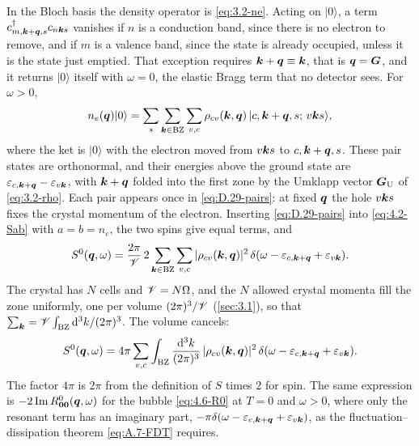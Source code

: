 In the Bloch basis the density operator is \cref{eq:3.2-ne}. Acting on $|0\rangle$, a term $c^\dagger_{m,\bm{k}+\bm{q},s}c_{n\bm{k}s}$ vanishes if $n$ is a conduction band, since there is no electron to remove, and if $m$ is a valence band, since the state is already occupied, unless it is the state just emptied. That exception requires $\bm{k} + \bm{q} \equiv \bm{k}$, that is $\bm{q} = \bm{G}$, and it returns $|0\rangle$ itself with $\omega = 0$, the elastic Bragg term that no detector sees. For $\omega > 0$,
\begin{equation}
  n_e(\bm{q})|0\rangle = \sum_s\sum_{\bm{k}\in\mathrm{BZ}}\sum_{v,c}\rho_{cv}(\bm{k},\bm{q})\,|c,\bm{k}+\bm{q},s;\,v\bm{k}s\rangle ,
  \label{eq:D.29-pairs}
\end{equation}
where the ket is $|0\rangle$ with the electron moved from $v\bm{k}s$ to $c,\bm{k}+\bm{q},s$. These pair states are orthonormal, and their energies above the ground state are $\varepsilon_{c,\bm{k}+\bm{q}} - \varepsilon_{v\bm{k}}$, with $\bm{k} + \bm{q}$ folded into the first zone by the Umklapp vector $\bm{G}_{\mathrm{U}}$ of \cref{eq:3.2-rho}. Each pair appears once in \cref{eq:D.29-pairs}: at fixed $\bm{q}$ the hole $v\bm{k}s$ fixes the crystal momentum of the electron. Inserting \cref{eq:D.29-pairs} into \cref{eq:4.2-Sab} with $a = b = n_e$, the two spins give equal terms, and
\begin{equation*}
  S^0(\bm{q},\omega) = \frac{2\pi}{\mathscr{V}}\,2\sum_{\bm{k}\in\mathrm{BZ}}\sum_{v,c}|\rho_{cv}(\bm{k},\bm{q})|^2\,\delta(\omega - \varepsilon_{c,\bm{k}+\bm{q}} + \varepsilon_{v\bm{k}}) .
\end{equation*}
The crystal has $N$ cells and $\mathscr{V} = N\Omega$, and the $N$ allowed crystal momenta fill the zone uniformly, one per volume $(2\pi)^3/\mathscr{V}$ (\cref{sec:3.1}), so that $\sum_{\bm{k}} = \mathscr{V}\int_{\mathrm{BZ}}\mathrm{d}^3k/(2\pi)^3$. The volume cancels:
\begin{equation}
  S^0(\bm{q},\omega) = 4\pi\sum_{v,c}\int_{\mathrm{BZ}}\frac{\mathrm{d}^3k}{(2\pi)^3}\,|\rho_{cv}(\bm{k},\bm{q})|^2\,\delta(\omega - \varepsilon_{c,\bm{k}+\bm{q}} + \varepsilon_{v\bm{k}}) .
  \label{eq:D.29-S0}
\end{equation}
The factor $4\pi$ is $2\pi$ from the definition of $S$ times 2 for spin. The same expression is $-2\operatorname{Im} R^0_{\bm{0}\bm{0}}(\bm{q},\omega)$ for the bubble \cref{eq:4.6-R0} at $T = 0$ and $\omega > 0$, where only the resonant term has an imaginary part, $-\pi\delta(\omega - \varepsilon_{c,\bm{k}+\bm{q}} + \varepsilon_{v\bm{k}})$, as the fluctuation--dissipation theorem \cref{eq:A.7-FDT} requires.

